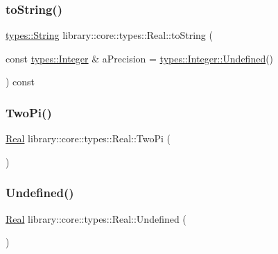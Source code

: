 \mbox{\label{classlibrary_1_1core_1_1types_1_1_real_a5d2632591e723b672323c60f1f4ec0be}} 
\subsubsection{\texorpdfstring{to\+String()}{toString()}}
{\footnotesize\ttfamily \hyperlink{classlibrary_1_1core_1_1types_1_1_string}{types\+::\+String} library\+::core\+::types\+::\+Real\+::to\+String (\begin{DoxyParamCaption}\item[{const \hyperlink{classlibrary_1_1core_1_1types_1_1_integer}{types\+::\+Integer} \&}]{a\+Precision = {\ttfamily \hyperlink{classlibrary_1_1core_1_1types_1_1_integer_a142c2df49031b787daf30673c73fcad7}{types\+::\+Integer\+::\+Undefined}()} }\end{DoxyParamCaption}) const}

\mbox{\label{classlibrary_1_1core_1_1types_1_1_real_ab6da87777d2c1c3517b3ee0c1b87f8a7}} 
\subsubsection{\texorpdfstring{Two\+Pi()}{TwoPi()}}
{\footnotesize\ttfamily \hyperlink{classlibrary_1_1core_1_1types_1_1_real}{Real} library\+::core\+::types\+::\+Real\+::\+Two\+Pi (\begin{DoxyParamCaption}{ }\end{DoxyParamCaption})\hspace{0.3cm}{\ttfamily [static]}}

\mbox{\label{classlibrary_1_1core_1_1types_1_1_real_a67778e3d4c5a5b6ca6ddcd47964b9a79}} 
\subsubsection{\texorpdfstring{Undefined()}{Undefined()}}
{\footnotesize\ttfamily \hyperlink{classlibrary_1_1core_1_1types_1_1_real}{Real} library\+::core\+::types\+::\+Real\+::\+Undefined (\begin{DoxyParamCaption}{ }\end{DoxyParamCaption})\hspace{0.3cm}{\ttfamily [static]}}

